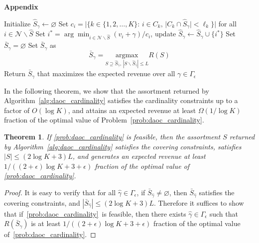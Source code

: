 \documentclass[msom,non-blindrev]{informs3} %
\newtheorem{theorem}{Theorem}
\theoremstyle{definition}
\begin{document}
\begin{appendices}{\Large \noindent\textbf{Appendix}}
{\begin{algorithm}[!ht]
\caption{Bicriteria Approximation algorithm for~\eqref{prob:daoc_cardinality}}
\SingleSpacedXI
\label{alg:daoc_cardinality}
\begin{algorithmic}
\For{$\gamma\in \Gamma_\epsilon$}
\State Initialize $\hat{S}_\gamma\leftarrow\varnothing$
\State Set $c_i=|\{k\in\{1,2,\dots,K\}:\,i\in C_k,\,|C_k\cap \hat{S}_\gamma|<\ell_k\}|$ for all $i\in\mathcal{N}\backslash\hat{S}$
\State Set $i^*=\arg\min_{i\in \mathcal{N}\backslash\hat{S}} (v_i+\gamma)/c_i$, update $\hat{S}_\gamma\leftarrow \hat{S}_\gamma\cup\{i^*\}$
\EndWhile
{}
\State Set $\bar{S}_\gamma=\varnothing$
\Else
\State Set $\bar{S}_\gamma$ as
\begin{equation*}
\bar{S}_{\gamma}=\underset{S\supseteq\hat{S}_{\hat{\gamma}},\,|S\backslash\hat{S}_{\hat{\gamma}}|\leq L}{\mathrm{argmax}} R(S)
\end{equation*}
\EndIf
\EndFor
\State Return $\bar{S}_\gamma$ that maximizes the expected revenue over all $\gamma\in \Gamma_\epsilon$
\end{algorithmic}
\end{algorithm}


In the following theorem, we show that the assortment returned by Algorithm~\ref{alg:daoc_cardinality} satisfies the cardinality constraints up to a factor of $O(\log K)$, and attains an expected revenue at least $\Omega(1/\log K)$ fraction of the optimal value of Problem~\eqref{prob:daoc_cardinality}.

\begin{theorem}
If \eqref{prob:daoc_cardinality} is feasible, then the assortment $S$ returned by Algorithm~\ref{alg:daoc_cardinality} satisfies the covering constraints, satisfies $|S|\leq (2\log K+3)L$, and generates an expected revenue at least $1/((2+\epsilon)\log K+3+\epsilon)$ fraction of the optimal value of \eqref{prob:daoc_cardinality}.

\end{theorem}

\begin{proof}

It is easy to verify that for all $\hat{\gamma}\in\Gamma_\epsilon$, if $\bar{S}_{\hat{\gamma}}\neq \varnothing$, then $\bar{S}_{\hat{\gamma}}$ satisfies the covering constraints, and \mbox{$|\bar{S}_{\hat{\gamma}}|\leq (2\log K+3)L$.} Therefore it suffices to show that if~\eqref{prob:daoc_cardinality}~is feasible, then there exists $\hat{\gamma}\in\Gamma_\epsilon$ such that $R(\bar{S}_{\hat{\gamma}})$ is at least $1/((2+\epsilon)\log K+3+\epsilon)$ fraction of the optimal value of~\eqref{prob:daoc_cardinality}.


\end{proof}}
\end{appendices}
\end{document}
